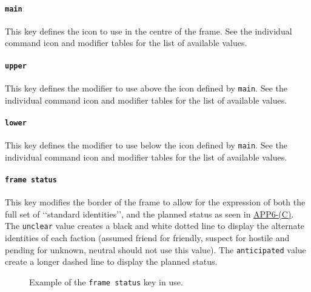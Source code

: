 \documentclass[a4paper, titlepage]{article}
\newcommand\DocLink{\href{https://www.awl.edu.pl/images/en/APP_6_C.pdf}{APP6-(C)}}
\begin{document}
\paragraph{\texttt{main}}

This key defines the icon to use in the centre of the frame. See the individual command icon and modifier tables for the list of available values.

\paragraph{\texttt{upper}} 

This key defines the modifier to use above the icon defined by \texttt{main}. See the individual command icon and modifier tables for the list of available values.

\paragraph{\texttt{lower}} 

This key defines the modifier to use below the icon defined by \texttt{main}. See the individual command icon and modifier tables for the list of available values.

\paragraph{\texttt{frame status}}

This key modifies the border of the frame to allow for the expression of both the full set of \lq\lq{}standard identities\rq\rq{}, and the planned status as seen in \DocLink. The \texttt{unclear} value creates a black and white dotted line to display the alternate identities of each faction (assumed friend for friendly, suspect for hostile and pending for unknown, neutral should not use this value). The \texttt{anticipated} value create a longer dashed line to display the planned status.

\begin{figure}[H]
\centering
{}
\caption{Example of the \texttt{frame status} key in use.}
\end{figure}
\end{document}
